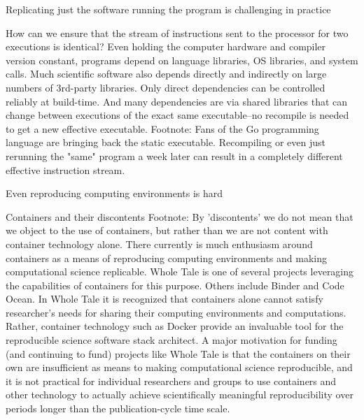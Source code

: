		Replicating just the software running the program is challenging in practice
	
			How can we ensure that the stream of instructions sent to the processor for two executions is identical?
			Even holding the computer hardware and compiler version constant, programs depend on language libraries, OS libraries, and system calls.
			Much scientific software also depends directly and indirectly on large numbers of 3rd-party libraries.
			Only direct dependencies can be controlled reliably at build-time.  And many dependencies are via shared libraries that can change between executions
				of the exact same executable--no recompile is needed to get a new effective executable.
			Footnote:  Fans of the Go programming language are bringing back the static executable.
			Recompiling or even just rerunning the "same" program a week later can result in a completely different effective instruction stream.
			
		Even reproducing computing environments is hard
	
			Containers and their discontents
				Footnote:  By 'discontents' we do not mean that we object to the use of containers, but rather than we are not content with container technology alone.
				There currently is much enthusiasm around containers as a means of reproducing computing environments and making computational science replicable.
				Whole Tale is one of several projects leveraging the capabilities of containers for this purpose.  Others include Binder and Code Ocean.
				In Whole Tale it is recognized that containers alone cannot satisfy researcher's needs for sharing their computing environments and computations.
				Rather, container technology such as Docker provide an invaluable tool for the reproducible science software stack architect.
				A major motivation for funding (and continuing to fund) projects like Whole Tale is that the containers on their own are insufficient as means
					to making computational science reproducible, and it is not practical for individual researchers and groups to use containers 
					and other technology to actually achieve scientifically meaningful reproducibility over periods longer than the publication-cycle time scale.
	
